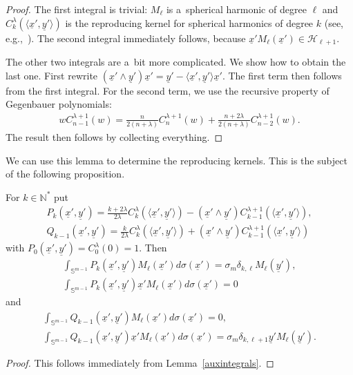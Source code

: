 \documentclass[pdftex]{sigma}
\numberwithin{equation}{section}
\numberwithin{theorem}{section}
\numberwithin{proposition}{section}
\numberwithin{lemma}{section}
\numberwithin{corollary}{section}
\numberwithin{definition}{section}
\numberwithin{example}{section}
\numberwithin{remark}{section}
\numberwithin{note}{section}
\theoremstyle{remark}
\newcommand{\mN}{\mathbb{N}}
\newcommand{\mS}{\mathbb{S}}
\newcommand{\cH}{\mathcal{H}}
\newcommand{\ux}{\underline{x}}
\newcommand{\uy}{\underline{y}}
\def\l{{\lambda}}
\def\s{{\sigma}}
\def\la{{\langle}}
\def\ra{{\rangle}}
\begin{document}
\begin{proof}
The f\/irst integral is trivial: $M_{\ell}$ is a~spherical harmonic of degree $\ell$ and
$C_{k}^{\lambda}(\la\ux',\uy'\ra)$ is the reproducing kernel for spherical harmonics of degree
$k$ (see, e.g.,~\cite{MR1827871}).
The second integral immediately follows, because $\ux'M_{\ell}(\ux')\in\cH_{\ell+1}$.

The other two integrals are a~bit more complicated.
We show how to obtain the last one.
First rewrite
$(\ux'\wedge\uy')\ux'=\uy'-\la\ux',\uy'\ra\ux'$.
The f\/irst term then follows from the f\/irst integral.
For the second term, we use the recursive property of Gegenbauer polynomials:
\begin{gather*}%
w C^{\l+1}_{n-1}(w)=\frac{n}{2(n+\l)}C^{\l+1}_{n}(w)+\frac{n+2\l}{2(n+\l)}
C^{\l+1}_{n-2}(w).
\end{gather*}
The result then follows by collecting everything.
\end{proof}

We can use this lemma to determine the reproducing kernels.
This is the subject of the following proposition.

\begin{proposition}
\label{reprkernels}
For $k\in\mN^{*}$ put
\begin{gather*}
P_{k}(\ux', \uy') = \frac{k+2\l}{2\l} C_{k}^{\l}(\la\ux', \uy' \ra) -(\ux' \wedge \uy' )
C_{k-1}^{\lambda+1}(\la\ux', \uy' \ra),\\
Q_{k-1}(\ux', \uy') = \frac{k}{2\l} C_{k}^{\l}(\la\ux', \uy' \ra) +(\ux' \wedge \uy' )
C_{k-1}^{\lambda+1}(\la\ux', \uy' \ra)
\end{gather*}
with $P_{0}(\ux',\uy')=C_{0}^{\l}(0)=1$.
Then
\begin{gather*}
\int_{\mS^{m-1}} P_{k}(\ux', \uy') M_{\ell}(\ux')d \s (\ux') = \sigma_m \delta_{k, \ell}
M_{\ell}(\uy'),\\
\int_{\mS^{m-1}} P_{k}(\ux', \uy') \ux'M_{\ell}(\ux')d \s (\ux') = 0
\end{gather*}
and
\begin{gather*}
\int_{\mS^{m-1}} Q_{k-1}(\ux', \uy') M_{\ell}(\ux')d \s (\ux') = 0,\\
\int_{\mS^{m-1}} Q_{k-1}(\ux', \uy') \ux'M_{\ell}(\ux')d \s (\ux') = \sigma_m \delta_{k, \ell+1}
\uy'M_{\ell}(\uy').
\end{gather*}
\end{proposition}

\begin{proof}
This follows immediately from Lemma~\ref{auxintegrals}.
\end{proof}
\end{document}

